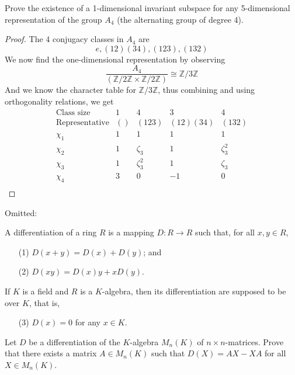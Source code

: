 \documentclass[openany]{book}
\newcommand{\Z}{\mathbb{Z}}
\begin{document}
\begin{prob}
    Prove the existence of a 1-dimensional invariant subspace for any 5-dimensional representation of the group \(A_4\) (the alternating group of degree 4).
\end{prob}
\begin{proof}
    The $4$ conjugacy classes in $A_4$ are 
    \begin{equation*}
        e, (12)(34), (123), (132)
    \end{equation*} 
    We now find the one-dimensional representation by observing 
    \begin{equation*}
        \frac{A_4}{(\Z/2\Z\times\Z/2\Z)}\cong\Z/3\Z
    \end{equation*}
    And we know the character table for $\Z/3\Z$, thus combining and using orthogonality relations, we get 
    \begin{equation*}
        \begin{array}{c|cccc}
            \text{Class size} & 1 & 4 & 3 & 4 \\
            \text{Representative} & () & (123) & (12)(34) & (132) \\
            \hline
            \chi_1 & 1 & 1 & 1 & 1 \\
            \chi_2 & 1 & \zeta_3 & 1 & \zeta_3^2 \\
            \chi_3 & 1 & \zeta_3^2 & 1 & \zeta_3 \\
            \chi_4 & 3 & 0 & -1 & 0 \\
            \end{array}
    \end{equation*}

\end{proof}



Omitted:

\begin{prob}
    A differentiation of a ring \(R\) is a mapping \(D : R \to R\) such that, for all \(x,y \in R\),
    \begin{itemize}
        \item[(1)] \(D(x+y) = D(x) + D(y)\); and
        \item[(2)] \(D(xy) = D(x)y + xD(y)\).
    \end{itemize}
    If \(K\) is a field and \(R\) is a \(K\)-algebra, then its differentiation are supposed to be over \(K\), that is,
    \begin{itemize}
        \item[(3)] \(D(x) = 0\) for any \(x \in K\).
    \end{itemize}
    Let \(D\) be a differentiation of the \(K\)-algebra \(M_n(K)\) of \(n \times n\)-matrices. Prove that there exists a matrix \(A \in M_n(K)\) such that \(D(X) = AX - XA\) for all \(X \in M_n(K)\).
\end{prob}
\end{document}
